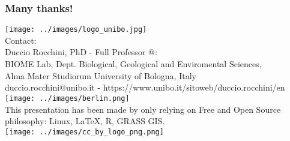 \documentclass{beamer}
\begin{document}
\begin{frame}
 \frametitle{Many thanks!}
\texttt{[image: ../images/logo\_unibo.jpg]}\\
\smallskip
\scriptsize{Contact:}\\
\scriptsize{Duccio Rocchini, PhD} -
\scriptsize{Full Professor $@$:}\\
\scriptsize{BIOME Lab, Dept. Biological, Geological and Enviromental Sciences, \\Alma Mater Studiorum University of Bologna, Italy}\\
\scriptsize{duccio.rocchini@unibo.it - https://www.unibo.it/sitoweb/duccio.rocchini/en}\\
\vspace{5mm} %
\texttt{[image: ../images/berlin.png]}\\
\smallskip
\tiny{This presentation has been made by only relying on Free and Open Source philosophy: Linux, \LaTeX, \textsf{R}, GRASS GIS.}
\\
\smallskip
\texttt{[image: ../images/cc\_by\_logo\_png.png]}\\
\end{frame}
\end{document}
